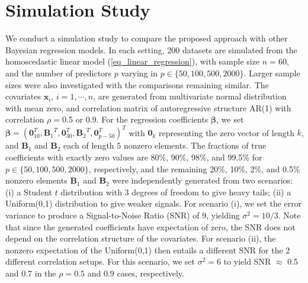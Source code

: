 \documentclass[12pt]{article}
\begin{document}


\section{Simulation Study}\label{sim.section}
We conduct a simulation study to compare the proposed approach with other Bayesian regression models. In each setting, 200 datasets are simulated from the homoscedastic linear model  (\ref{eq_linear_regression}), with sample size  $n = 60$, and the number of predictors $p$  varying  in $p\in\{50, 100, 500, 2000\}$. Larger sample sizes were also investigated with the comparisons remaining similar. The covariates $ \bm{x}_i$,  $i=1,\cdots,n$,  are generated from multivariate normal distribution with mean zero, and correlation matrix of autoregressive  structure  AR(1)  with correlation  $\rho=$0$.$5 or 0$.$9.  For the regression coefficients $ \bm{\beta}$, we set
$ \bm\beta= ({\bm 0}_{10}^T,{\bm B_1}^T,{\bm 0}_{30}^T,{\bm B_2}^T,{\bm 0}^T_{p-50})^T$
with  ${\bm 0}_k$ representing the zero vector of length $k$, and  ${\bm B_1}$ and $ \bm B_2$  each of length $5$ nonzero elements.
The  fractions of  true coefficients with exactly zero values
are 80\%, 90\%, 98\%, and 99.5\% for $p\in\{50, 100,   500, 2000\} $, respectively,   and the remaining  20\%, 10\%, 2\%, and 0.5\% nonzero elements  ${\bm B_1}$ and ${\bm B_2}$   were  independently generated from  two scenarios:
 (i) a   Student  $t$ distribution with 3 degrees of freedom to  give heavy tails; (ii) a Uniform(0,1)  distribution to give weaker signals. For scenario (i), we set the error variance to produce a Signal-to-Noise Ratio (SNR) of 9, yielding $\sigma^2 = 10/3$. Note that since the generated coefficients have expectation of zero, the SNR does not depend on the correlation structure of the covariates. For scenario (ii), the nonzero expectation of the Uniform(0,1) then entails a different SNR for the 2 different correlation setups. For this scenario, we set $\sigma^2 = 6$ to yield SNR $\approx$ 0.5 and 0.7 in the $\rho = 0.5$ and $0.9$ cases, respectively.
\end{document}
